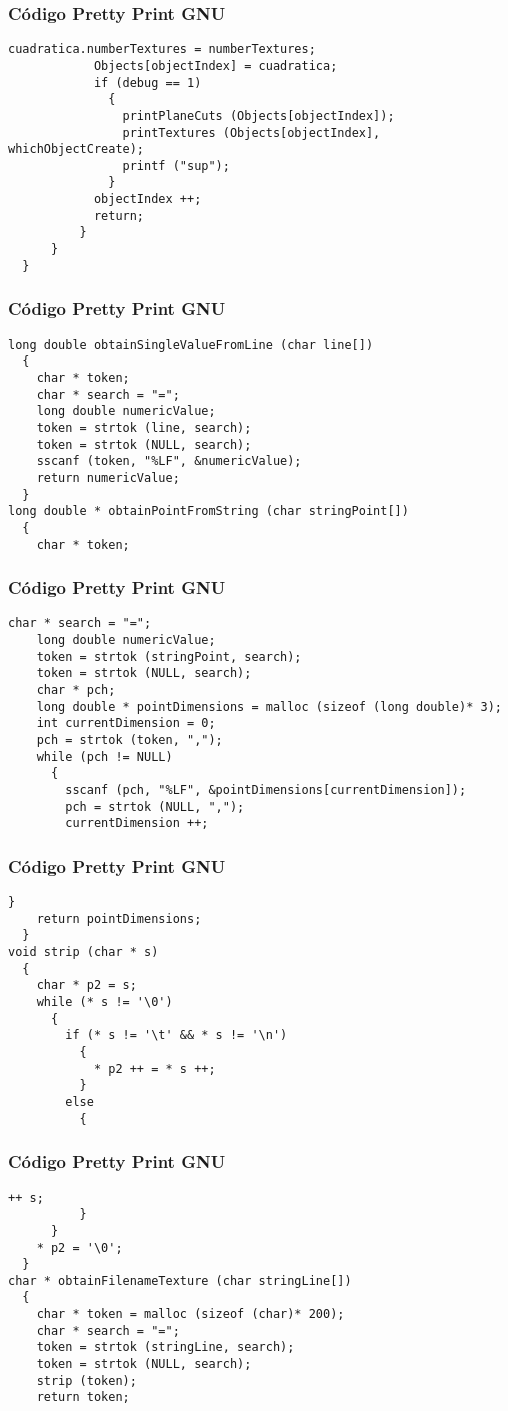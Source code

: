 \documentclass{beamer}
\begin{document}
\begin{frame}[fragile]
\frametitle{C\'odigo Pretty Print GNU}
\begin{lstlisting}[style=CStyle]
            cuadratica.numberTextures = numberTextures;
            Objects[objectIndex] = cuadratica;
            if (debug == 1)
              {
                printPlaneCuts (Objects[objectIndex]);
                printTextures (Objects[objectIndex], whichObjectCreate);
                printf ("sup");
              }
            objectIndex ++;
            return;
          }
      }
  }
\end{lstlisting}
\end{frame}
\begin{frame}[fragile]
\frametitle{C\'odigo Pretty Print GNU}
\begin{lstlisting}[style=CStyle]
long double obtainSingleValueFromLine (char line[])
  {
    char * token;
    char * search = "=";
    long double numericValue;
    token = strtok (line, search);
    token = strtok (NULL, search);
    sscanf (token, "%LF", &numericValue);
    return numericValue;
  }
long double * obtainPointFromString (char stringPoint[])
  {
    char * token;
\end{lstlisting}
\end{frame}
\begin{frame}[fragile]
\frametitle{C\'odigo Pretty Print GNU}
\begin{lstlisting}[style=CStyle]
    char * search = "=";
    long double numericValue;
    token = strtok (stringPoint, search);
    token = strtok (NULL, search);
    char * pch;
    long double * pointDimensions = malloc (sizeof (long double)* 3);
    int currentDimension = 0;
    pch = strtok (token, ",");
    while (pch != NULL)
      {
        sscanf (pch, "%LF", &pointDimensions[currentDimension]);
        pch = strtok (NULL, ",");
        currentDimension ++;
\end{lstlisting}
\end{frame}
\begin{frame}[fragile]
\frametitle{C\'odigo Pretty Print GNU}
\begin{lstlisting}[style=CStyle]
      }
    return pointDimensions;
  }
void strip (char * s)
  {
    char * p2 = s;
    while (* s != '\0')
      {
        if (* s != '\t' && * s != '\n')
          {
            * p2 ++ = * s ++;
          }
        else
          {
            \end{lstlisting}
\end{frame}
\begin{frame}[fragile]
\frametitle{C\'odigo Pretty Print GNU}
\begin{lstlisting}[style=CStyle]
            ++ s;
          }
      }
    * p2 = '\0';
  }
char * obtainFilenameTexture (char stringLine[])
  {
    char * token = malloc (sizeof (char)* 200);
    char * search = "=";
    token = strtok (stringLine, search);
    token = strtok (NULL, search);
    strip (token);
    return token;
\end{lstlisting}
\end{frame}
\end{document}
